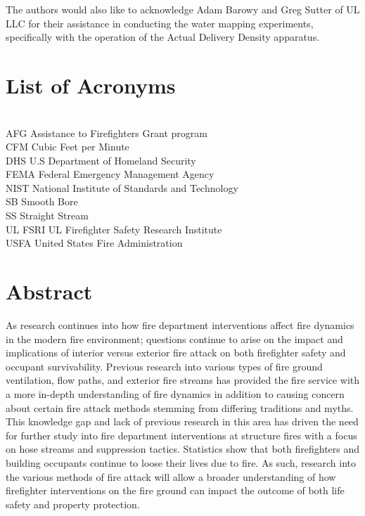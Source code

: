 \documentclass[12pt,oneside]{book}
\begin{document}
The authors would also like to acknowledge Adam Barowy and Greg Sutter of UL LLC for their assistance in conducting the water mapping experiments, specifically with the operation of the Actual Delivery Density apparatus.

\cleardoublepage
{}
{}
\tableofcontents

\cleardoublepage
{}
{}
\listoffigures

\cleardoublepage
{}
{}
\listoftables

\chapter{List of Acronyms}

\begin{tabbing}
\hspace{1.5in} \= \\
AFG \> Assistance to Firefighters Grant program  \\
CFM \> Cubic Feet per Minute \\
DHS \> U.S Department of Homeland Security   \\   
FEMA \> Federal Emergency Management Agency  \\
NIST \> National Institute of Standards and Technology \\
SB \> Smooth Bore \\
SS \> Straight Stream \\
UL FSRI \> UL Firefighter Safety Research Institute \\
USFA \> United States Fire Administration  \\
\end{tabbing}

\newpage

\mainmatter

\chapter*{\centering Abstract}
As research continues into how fire department interventions affect fire dynamics in the modern fire environment; questions continue to arise on the impact and implications of interior versus exterior fire attack on both firefighter safety and occupant survivability. Previous research into various types of fire ground ventilation, flow paths, and exterior fire streams has provided the fire service with a more in-depth understanding of fire dynamics in addition to causing concern about certain fire attack methods stemming from differing traditions and myths. This knowledge gap and lack of previous research in this area has driven the need for further study into fire department interventions at structure fires with a focus on hose streams and suppression tactics. Statistics show that both firefighters and building occupants continue to loose their lives due to fire. As such, research into the various methods of fire attack will allow a broader understanding of how firefighter interventions on the fire ground can impact the outcome of both life safety and property protection. 
\end{document}
